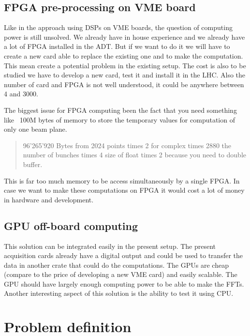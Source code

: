 \subsection{FPGA pre-processing on VME board}

Like in the approach using \glspl{DSP} on VME boards, the question of computing power is still unsolved. We already have in house experience and we already have a lot of \gls{FPGA} installed in the \gls{ADT}. But if we want to do it we will have to create a new card able to replace the existing one and to make the computation. This mean create a potential problem in the existing setup. The cost is also to be studied we have to develop a new card, test it and install it in the \gls{LHC}. Also the number of card and FPGA is not well understood, it could be anywhere between 4 and 3000. 

The biggest issue for FPGA computing been the fact that you need something like ~100M bytes of memory to store the temporary values for computation of only one beam plane.

\begin{quotation}
96'265'920 Bytes from 2024 points times 2 for complex times 2880 the number of bunches times 4 size of float times 2 because you need to double buffer.
\end{quotation}

This is far too much memory to be access simultaneously by a single \gls{FPGA}. In case we want to make these computations on \gls{FPGA} it would cost a lot of money in hardware and development.

\subsection{GPU off-board computing}

This solution can be integrated easily in the present setup. The present acquisition cards already have a digital output and could be used to transfer the data in another crate that could do the computations. The \glspl{GPU} are cheap (compare to the price of developing a new \gls{VME} card) and easily scalable. The \gls{GPU} should have largely enough computing power to be able to make the \glspl{FFT}. Another interesting aspect of this solution is the ability to test it using \gls{CPU}.

\section{Problem definition}


